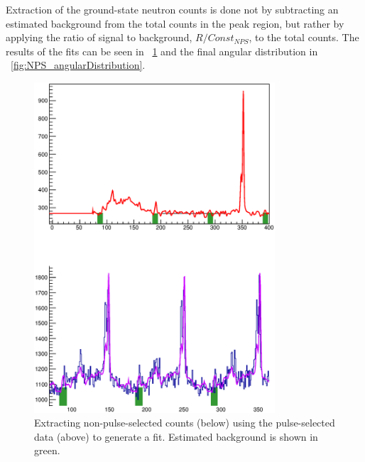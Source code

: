 Extraction of the ground-state neutron counts is done not by subtracting an estimated background from the total counts in the peak region, but rather by applying the ratio of signal to background, $R/Const_{NPS}$, to the total counts.  The results of the fits can be seen in {\fig}~\ref{fig:NPS_fits} and the final angular distribution in {\fig}~\ref{fig:NPS_angularDistribution}.
\begin{figure}[!htbp]
\centering
\includegraphics[width=0.8\textwidth]{figures/PDE_1.eps}
\caption{Extracting non-pulse-selected counts (below) using the pulse-selected data (above) to generate a fit.  Estimated background is shown in green.}
\label{fig:NPS_fits}
\end{figure}


